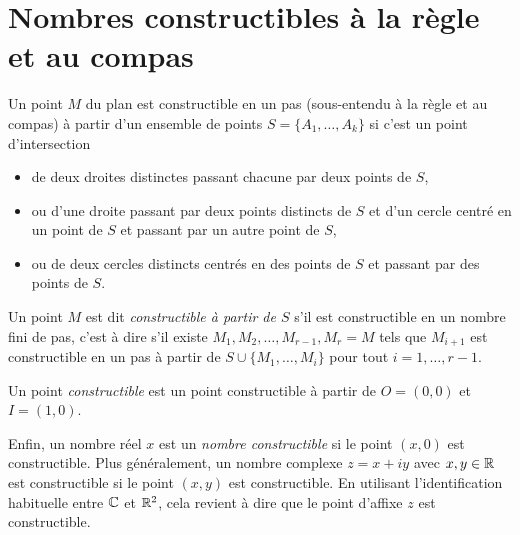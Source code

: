 \documentclass[a4paper,11pt,reqno]{amsart}
\begin{document}
\section{Nombres constructibles à la règle et au compas}


\begin{convention}\small
  Un point $M$ du plan est constructible en un pas (sous-entendu à la règle et au compas) à partir d'un ensemble de points $S=\{A_1,\ldots,A_k\}$ si c'est un point d'intersection
  \begin{itemize}
    \item de deux droites distinctes passant chacune par deux points de $S$,
    \item ou d'une droite passant par deux points distincts de $S$ et d'un cercle centré en un point de $S$ et passant par un autre point de $S$,
    \item ou de deux cercles distincts centrés en des points de $S$ et passant par des points de $S$.
  \end{itemize}

  Un point $M$ est dit \emph{constructible à partir de $S$} s'il est constructible en un nombre fini de pas, c'est à dire s'il existe $M_1,M_2,\ldots,M_{r-1},M_r=M$ tels que $M_{i+1}$ est constructible en un pas à partir de $S \cup \{M_1,\ldots,M_{i}\}$ pour tout $i=1,\ldots,r-1$.

  Un point \emph{constructible} est un point constructible à partir de $O=(0,0)$ et $I=(1,0)$.

  Enfin, un nombre réel $x$ est un \emph{nombre constructible} si le point $(x,0)$ est constructible. Plus généralement, un nombre complexe $z=x+iy$ avec $x,y \in \mathbb{R}$ est constructible si le point $(x,y)$ est constructible. En utilisant l'identification habituelle entre $\mathbb{C}$ et $\mathbb{R}^2$,  cela revient à dire que le point d'affixe $z$ est constructible.
\end{convention}
\end{document}
